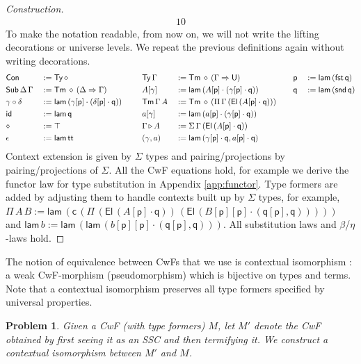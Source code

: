 \documentclass[a4paper,UKenglish]{article}
\newtheorem{problem}[theorem]{Problem}
\newcommand{\Ra}{\Rightarrow}
\newcommand{\Ty}{\mathsf{Ty}}
\newcommand{\Tm}{\mathsf{Tm}}
\newcommand{\Con}{\mathsf{Con}}
\newcommand{\Sub}{\mathsf{Sub}}
\newcommand{\p}{\mathsf{p}}
\newcommand{\q}{\mathsf{q}}
\newcommand{\ext}{\mathop{\triangleright}}
\newcommand{\lam}{\mathsf{lam}}
\newcommand{\U}{\mathsf{U}}
\newcommand{\El}{\mathsf{El}}
\newcommand{\cd}{\mathsf{c}}
\renewcommand{\tt}{\mathsf{tt}}
\newcommand{\fst}{\mathsf{fst}}
\newcommand{\snd}{\mathsf{snd}}
\newcommand{\id}{\mathsf{id}}
\begin{document}
\begin{proof}[Construction]
\begin{alignat*}{10}
  \end{alignat*}
  To make the notation readable, from now on, we will not write the
  lifting decorations or universe levels. We repeat the previous
  definitions again without writing decorations.
  \begin{alignat*}{10}
    & \Con && := \Ty\,\diamond                                           && \Ty\,\Gamma && := \Tm\,\diamond\,(\Gamma\Ra\U) && \p && := \lam\,(\fst\,\q) \\                     
    & \Sub\,\Delta\,\Gamma && := \Tm\,\diamond\,(\Delta\Ra\Gamma)        && A[\gamma] && := \lam\,(A[\p]\cdot(\gamma[\p]\cdot\q)) && \q && := \lam\,(\snd\,\q) \\
    & \gamma\circ\delta && := \lam\,(\gamma[\p]\cdot(\delta[\p]\cdot\q)) \hspace{1.5em} && \Tm\,\Gamma\,A && := \Tm\,\diamond\,(\Pi\,\Gamma\,(\El\,(A[\p]\cdot\q)))\hspace{1.1em} \\   
    & \id && := \lam\,\q                                                 && a[\gamma] && := \lam\,(a[\p]\cdot(\gamma[\p]\cdot\q)) \\                      
    & \diamond && := \top                                                && \Gamma\ext A && := \Sigma\,\Gamma\,(\El\,(A[\p]\cdot\q)) \\                   
    & \epsilon && := \lam\,\tt                                           && (\gamma,a) && := \lam\,(\gamma[\p]\cdot\q,a[\p]\cdot\q)
  \end{alignat*}
  Context extension is given by $\Sigma$ types and pairing/projections
  by pairing/projections of $\Sigma$. All the CwF equations hold, for
  example we derive the functor law for type substitution in Appendix
  \ref{app:functor}. Type formers are added by adjusting them to handle contexts built up
  by $\Sigma$ types, for example,
  $
  \Pi\,A\,B := \lam\,(\cd\,(\Pi\,(\El\,(A[\p]\cdot\q))\,(\El\,(B[\p][\p]\cdot(\q[\p],\q)))))
  $
  and $\lam\,b := \lam\,(\lam\,(b[\p][\p]\cdot(\q[\p],\q)))$. All
  substitution laws and $\beta$/$\eta$-laws hold.
\end{proof}
The notion of equivalence between CwFs that we use is contextual
isomorphism \cite{DBLP:journals/corr/abs-2211-07487}: a weak
CwF-morphism (pseudomorphism) which is bijective on types and
terms. Note that a contextual isomorphism preserves all type formers
specified by universal properties.
\begin{problem}
  Given a CwF (with type formers) $M$, let $M'$ denote the CwF
  obtained by first seeing it as an SSC and then termifying it. We
  construct a contextual isomorphism between $M'$ and $M$.
\end{problem}
\end{document}

